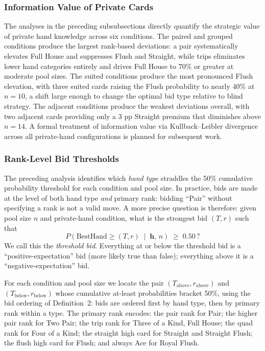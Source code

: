 \documentclass[11pt, a4paper]{article}
\theoremstyle{definition}
\begin{document}
\clearpage
\subsubsection{Information Value of Private Cards}

The analyses in the preceding subsubsections directly quantify the strategic value of private
hand knowledge across six conditions.
The paired and grouped conditions produce the largest rank-based deviations: a pair
systematically elevates Full House and suppresses Flush and Straight, while trips eliminates
lower hand categories entirely and drives Full House to $70\%$ or greater at moderate pool sizes.
The suited conditions produce the most pronounced Flush elevation, with three suited cards
raising the Flush probability to nearly $40\%$ at $n = 10$, a shift large enough to change
the optimal bid type relative to blind strategy.
The adjacent conditions produce the weakest deviations overall, with two adjacent cards providing
only a $3$ pp Straight premium that diminishes above $n = 14$.
A formal treatment of information value via Kullback--Leibler divergence across all
private-hand configurations is planned for subsequent work.

\clearpage
\subsubsection{Rank-Level Bid Thresholds}
\label{sec:thresholds}

The preceding analysis identifies which \emph{hand type} straddles the 50\% cumulative
probability threshold for each condition and pool size.  In practice, bids are made at the
level of both hand type \emph{and} primary rank: bidding ``Pair'' without specifying a rank is
not a valid move.  A more precise question is therefore: given pool size $n$ and private-hand
condition, what is the strongest bid $(T, r)$ such that
\[
    P\!\left(\mathrm{BestHand} \geq (T,r) \;\middle|\; \mathbf{h},\, n\right) \;\geq\; 0.50\,?
\]
We call this the \emph{threshold bid}.  Everything at or below the threshold bid is a
``positive-expectation'' bid (more likely true than false); everything above it is a
``negative-expectation'' bid.

For each condition and pool size we locate the pair $(T_{\mathrm{above}}, r_{\mathrm{above}})$
and $(T_{\mathrm{below}}, r_{\mathrm{below}})$ whose cumulative at-least probabilities bracket
50\%, using the bid ordering of Definition~2: bids are ordered first by hand type, then by
primary rank within a type.  The primary rank encodes: the pair rank for Pair; the higher pair
rank for Two Pair; the trip rank for Three of a Kind, Full House; the quad rank for Four of a
Kind; the straight high card for Straight and Straight Flush; the flush high card for Flush; and
always Ace for Royal Flush.
\end{document}
